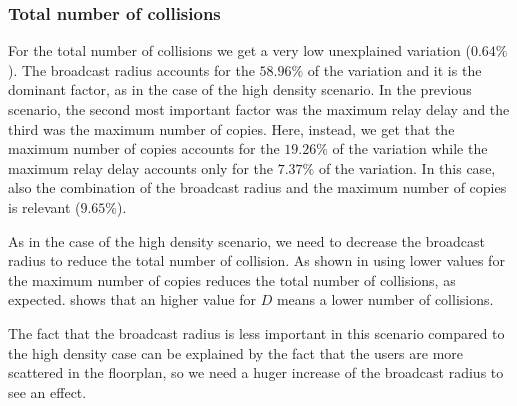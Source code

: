 \subsubsection{Total number of collisions}\label{subsubsec:ld2krcollisions}

For the total number of collisions we get a very low unexplained variation
(\(0.64\%\)). The broadcast radius accounts for the \(58.96\%\) of the variation
and it is the dominant factor, as in the case of the high density scenario. In
the previous scenario, the second most important factor was the maximum relay
delay and the third was the maximum number of copies. Here, instead, we get that
the maximum number of copies accounts for the \(19.26\%\) of the variation while
the maximum relay delay accounts only for the \(7.37\%\) of the variation. In
this case, also the combination of the broadcast radius and the maximum number
of copies is relevant (\(9.65\%\)).

As in the case of the high density scenario, we need to decrease the broadcast
radius to reduce the total number of collision. As shown in
 using lower values for the maximum number of
copies reduces the total number of collisions, as expected.
 shows that an higher value for \(D\) means
a lower number of collisions.

The fact that the broadcast radius is less important in this scenario compared
to the high density case can be explained by the fact that the users are more
scattered in the floorplan, so we need a huger increase of the broadcast radius
to see an effect.


